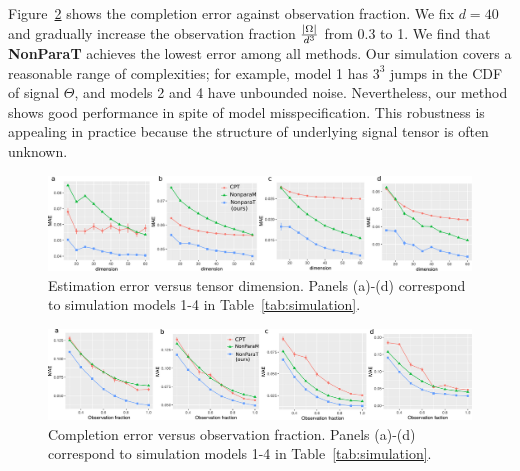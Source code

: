 \documentclass[useAMS,usenatbib,usegraphicx,referee]{biom}
\theoremstyle{plain}
\theoremstyle{definition}
\begin{document}
Figure~\ref{fig:compare2} shows the completion error against observation fraction. We fix $d=40$ and gradually increase the observation fraction ${|\Omega|\over d^3}$ from 0.3 to 1. We find that {\bf NonParaT} achieves the lowest error among all methods. Our simulation covers a reasonable range of  complexities; for example, model 1 has $3^3$ jumps in the CDF of signal $\Theta$, and models 2 and 4 have unbounded noise. Nevertheless, our method shows good performance in spite of model misspecification. This robustness is appealing in practice because the structure of underlying signal tensor is often unknown. 

\begin{figure}[h!]
\includegraphics[width=\textwidth]{figure/fig1-4v2.pdf}
 \captionsetup{justification=raggedright,font=small}
\caption{Estimation error versus tensor dimension. Panels (a)-(d) correspond to simulation models 1-4 in Table~\ref{tab:simulation}.}\label{fig:compare1}
\end{figure}

\vspace{-.4cm}
\begin{figure}[h!]
\includegraphics[width=\textwidth]{figure/fig5-8v2.pdf}
 \captionsetup{justification=raggedright,font=small}
\caption{Completion error versus observation fraction. Panels (a)-(d) correspond to simulation models 1-4 in Table~\ref{tab:simulation}. }\label{fig:compare2}
\end{figure}

\vspace{-1cm}
\end{document}
